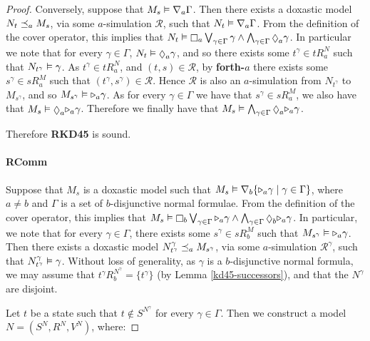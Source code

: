 \begin{proof}
Conversely, suppose that $M_s \vDash \nabla_a \Gamma$. Then there exists a
doxastic model $N_t \preceq_a M_s$, via some $a$-simulation $\mathcal{R}$,
such that $N_t \vDash \nabla_a \Gamma$. From the definition of the cover
operator, this implies that $N_t \entails \knows_a \bigvee_{\gamma \in \Gamma}
\gamma \land \bigwedge_{\gamma \in \Gamma} \suspects_a \gamma$. In particular we
note that for every $\gamma \in \Gamma$, $N_t \entails \suspects_a \gamma$, and
so there exists some $t^\gamma \in tR^N_a$ such that $N_{t^\gamma} \vDash
\gamma$. As $t^\gamma \in tR^N_a$, and $(t, s) \in \mathcal{R}$, by {\bf
forth-$a$} there exists some $s^\gamma \in sR^M_a$ such that $(t^\gamma, s^\gamma)
\in \mathcal{R}$. Hence $\mathcal{R}$ is also an $a$-simulation from
$N_{t^\gamma}$ to $M_{s^\gamma}$, and so $M_{s^\gamma} \vDash {\ensuremath{\mathopen{\triangleright}}}_a
\gamma$. As for every $\gamma \in \Gamma$ we have that $s^\gamma \in sR^M_a$, we
also have that $M_s \entails \suspects_a \somerefs_a \gamma$. Therefore we
finally have that $M_s \entails \bigwedge_{\gamma \in \Gamma} \suspects_a
\somerefs_a \gamma$.

Therefore {\bf RKD45} is sound.

\paragraph{RComm} Suppose that $M_s$ is a doxastic model such that $M_s
\vDash \nabla_b \{ {\mathopen{\triangleright}}_a \gamma \mid \gamma \in \Gamma\}$, where $a \ne
b$ and $\Gamma$ is a set of $b$-disjunctive normal formulae. From the definition
of the cover operator, this implies that $M_s \entails \knows_b \bigvee_{\gamma
\in \Gamma} \somerefs_a \gamma \land \bigwedge_{\gamma \in \Gamma} \suspects_b
\somerefs_a \gamma$. In particular, we note that for every $\gamma \in \Gamma$,
there exists some $s^\gamma \in sR^M_b$ such that $M_{s^\gamma} \vDash
{\ensuremath{\mathopen{\triangleright}}}_a \gamma$.  Then there exists a doxastic model $N^\gamma_{t^\gamma}
\preceq_a M_{s^\gamma}$, via some $a$-simulation $\mathcal{R}^\gamma$, such
that $N^\gamma_{t^\gamma} \vDash \gamma$. Without loss of generality, as
$\gamma$ is a $b$-disjunctive normal formula, we may assume that $t^\gamma
R^{N^\gamma}_b = \{t^\gamma\}$ (by Lemma \ref{kd45-successors}), and that the
$N^\gamma$ are disjoint.

Let $t$ be a state such that $t \notin S^{N^\gamma}$ for every $\gamma \in
\Gamma$. Then we construct a model $N = (S^N, R^N, V^N)$, where:


\end{proof}
